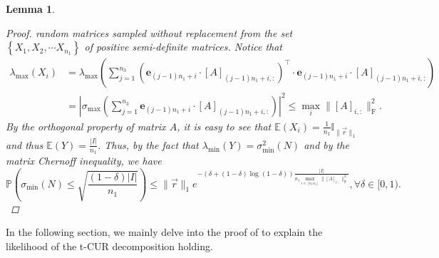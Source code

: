 \documentclass[twoside,12pt]{article}
\newtheorem{lemma}{Lemma}
\def\fro{{\mathrm{F}}}
\def\fro{{\mathrm{F}}}
\begin{document}
\begin{lemma}
\begin{proof}
random matrices %
sampled without replacement from the   set $\left\{X_1, X_2, \cdots X_{n_1}\right\}$ of positive semi-definite matrices. 
Notice that 
\begin{align*}
\lambda_{\max}\left(X_i\right) 
    &= \lambda_{\max}\left( \sum_{j=1}^{n_3} (\mathbf{e}_{(j-1) n_1+i}\cdot [A]_{(j-1) n_1+i,:})^{\top}\cdot \mathbf{e}_{(j-1) n_1+i}\cdot [A]_{(j-1) n_1+i,:}\right)\\
&=\left|\sigma_{\max}\left(\sum_{j=1}^{n_3} \mathbf{e}_{(j-1) n_1+i}\cdot [A]_{(j-1) n_1+i,:}\right)\right|^{2} 
    \leq \max_{i}\|[A]_{i,:}\|_{\fro}^{2}.
\end{align*}
By the orthogonal property of matrix $A$, it is easy to see that $\mathbb{E}\left(X_i\right)=\frac{1}{n_1}\mathbb{I}_{\|\vec{r}\|_1}$ and thus $\mathbb{E}(Y)=\frac{|I|}{n_1}$.  Thus, by the fact that $\lambda_{\min}(Y) = \sigma_{\min}^2(N)$ and by the matrix Chernoff inequality, we have
\[
\mathbb{P}\left(\sigma_{\min}(N) \leq \sqrt{\frac{(1-\delta) |I|}{n_1}}\right) \leq
\|\vec{r}\|_1e^{-(\delta+(1-\delta)\log(1-\delta))\frac{|I|}  {n_{1}\max_{i\in[n_1n_3]}{\|[A]_{i,:}\|_{\fro}^2}}}, \forall \delta \in [0,1).
\]
\end{proof}
\end{lemma}
\vspace{-35pt}
In the following section, we mainly delve into the proof of  to  explain the likelihood of the t-CUR decomposition holding.
\end{document}
